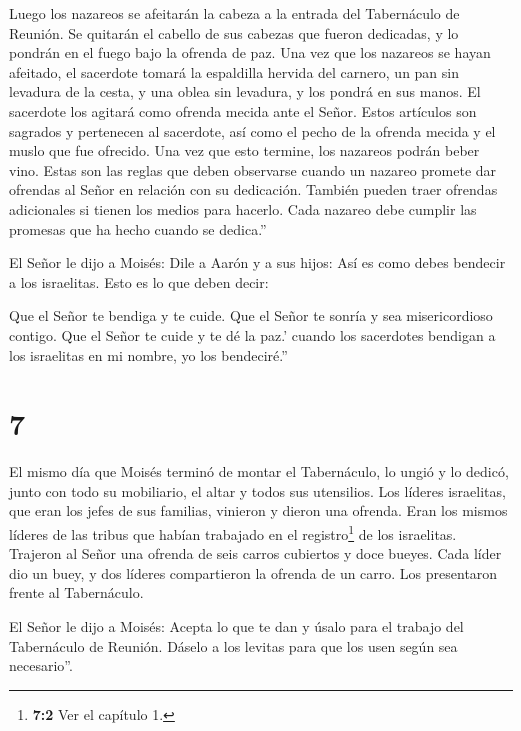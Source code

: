  Luego los nazareos se afeitarán la cabeza a la entrada del
Tabernáculo de Reunión. Se quitarán el cabello de sus cabezas que fueron
dedicadas, y lo pondrán en el fuego bajo la ofrenda de paz.
 Una vez que los nazareos se hayan afeitado, el sacerdote
tomará la espaldilla hervida del carnero, un pan sin levadura de la
cesta, y una oblea sin levadura, y los pondrá en sus manos.
 El sacerdote los agitará como ofrenda mecida ante el
Señor. Estos artículos son sagrados y pertenecen al sacerdote, así como
el pecho de la ofrenda mecida y el muslo que fue ofrecido. Una vez que
esto termine, los nazareos podrán beber vino.  Estas son
las reglas que deben observarse cuando un nazareo promete dar ofrendas
al Señor en relación con su dedicación. También pueden traer ofrendas
adicionales si tienen los medios para hacerlo. Cada nazareo debe cumplir
las promesas que ha hecho cuando se dedica.''

 El Señor le dijo a Moisés:  Dile a Aarón y a
sus hijos: Así es como debes bendecir a los israelitas. Esto es lo que
deben decir:

 Que el Señor te bendiga y te cuide.  Que el
Señor te sonría y sea misericordioso contigo.  Que el Señor
te cuide y te dé la paz.'  cuando los sacerdotes bendigan a
los israelitas en mi nombre, yo los bendeciré.''

\hypertarget{section-6}{%
\section{7}\label{section-6}}

 El mismo día que Moisés terminó de montar el Tabernáculo,
lo ungió y lo dedicó, junto con todo su mobiliario, el altar y todos sus
utensilios.  Los líderes israelitas, que eran los jefes de
sus familias, vinieron y dieron una ofrenda. Eran los mismos líderes de
las tribus que habían trabajado en el registro\footnote{\textbf{7:2} Ver
  el capítulo 1.} de los israelitas.  Trajeron al Señor una
ofrenda de seis carros cubiertos y doce bueyes. Cada líder dio un buey,
y dos líderes compartieron la ofrenda de un carro. Los presentaron
frente al Tabernáculo.

 El Señor le dijo a Moisés:  Acepta lo que te
dan y úsalo para el trabajo del Tabernáculo de Reunión. Dáselo a los
levitas para que los usen según sea necesario''.

